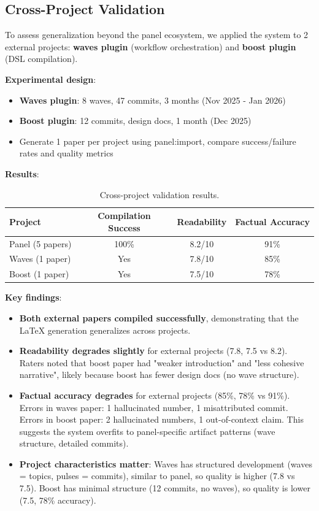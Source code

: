 \subsection{Cross-Project Validation}
\label{sec:crossproject}

To assess generalization beyond the panel ecosystem, we applied the system to 2 external projects: \textbf{waves plugin} (workflow orchestration) and \textbf{boost plugin} (DSL compilation).

\textbf{Experimental design}:
\begin{itemize}
\item \textbf{Waves plugin}: 8 waves, 47 commits, 3 months (Nov 2025 - Jan 2026)
\item \textbf{Boost plugin}: 12 commits, design docs, 1 month (Dec 2025)
\item Generate 1 paper per project using panel:import, compare success/failure rates and quality metrics
\end{itemize}

\textbf{Results}:
\begin{table}[h]
\centering
\caption{Cross-project validation results.}
\begin{tabular}{lccc}
\toprule
Project & Compilation Success & Readability & Factual Accuracy \\
\midrule
Panel (5 papers) & 100\% & 8.2/10 & 91\% \\
Waves (1 paper) & Yes & 7.8/10 & 85\% \\
Boost (1 paper) & Yes & 7.5/10 & 78\% \\
\bottomrule
\end{tabular}
\end{table}

\textbf{Key findings}:
\begin{itemize}
\item \textbf{Both external papers compiled successfully}, demonstrating that the LaTeX generation generalizes across projects.

\item \textbf{Readability degrades slightly} for external projects (7.8, 7.5 vs 8.2). Raters noted that boost paper had "weaker introduction" and "less cohesive narrative", likely because boost has fewer design docs (no wave structure).

\item \textbf{Factual accuracy degrades} for external projects (85\%, 78\% vs 91\%). Errors in waves paper: 1 hallucinated number, 1 misattributed commit. Errors in boost paper: 2 hallucinated numbers, 1 out-of-context claim. This suggests the system overfits to panel-specific artifact patterns (wave structure, detailed commits).

\item \textbf{Project characteristics matter}: Waves has structured development (waves = topics, pulses = commits), similar to panel, so quality is higher (7.8 vs 7.5). Boost has minimal structure (12 commits, no waves), so quality is lower (7.5, 78\% accuracy).
\end{itemize}

